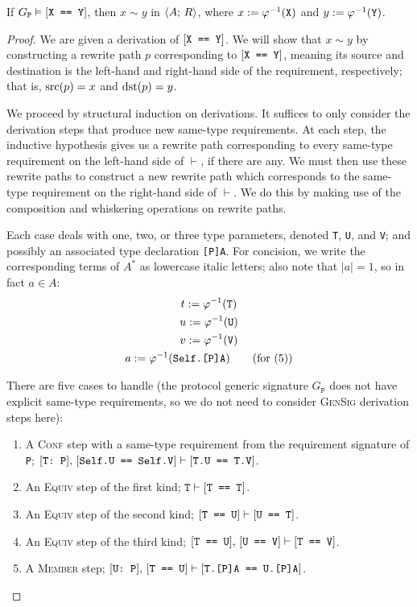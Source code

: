 \documentclass[../generics]{subfiles}
\begin{document}
\begin{theorem}\label{derivation to path}
If $G_\texttt{P}\vDash[\texttt{X == Y}]$, then $x\sim y$ in $\langle A;\,R\rangle$, where $x:=\varphi^{-1}(\texttt{X})$ and $y:=\varphi^{-1}(\texttt{Y})$.
\end{theorem}
\begin{proof}
We are given a derivation of $[\texttt{X == Y}]$. We will show that $x\sim y$ by constructing a rewrite path $p$ corresponding to $[\texttt{X == Y}]$, meaning its source and destination is the left-hand and right-hand side of the requirement, respectively; that is, $\operatorname{src}(p)=x$ and $\operatorname{dst}(p)=y$.

We proceed by structural induction on derivations. It suffices to only consider the derivation steps that produce new same-type requirements. At each step, the inductive hypothesis gives us a rewrite path corresponding to every same-type requirement on the left-hand side of $\vdash$, if there are any. We must then use these rewrite paths to construct a new rewrite path which corresponds to the same-type requirement on the right-hand side of $\vdash$. We do this by making use of the composition and whiskering operations on rewrite paths.

Each case deals with one, two, or three type parameters, denoted \texttt{T}, \texttt{U}, and \texttt{V}; and possibly an associated type declaration \texttt{[P]A}. For concision, we write the corresponding terms of $A^*$ as lowercase italic letters; also note that $|a|=1$, so in fact $a\in A$:
\begin{gather*}
t:=\varphi^{-1}(\texttt{T})\\
u:=\varphi^{-1}(\texttt{U})\\
v:=\varphi^{-1}(\texttt{V})\\
a:=\varphi^{-1}(\texttt{Self.[P]A})\qquad\mbox{(for (5))}
\end{gather*}

There are five cases to handle (the protocol generic signature $G_\texttt{P}$ does not have explicit same-type requirements, so we do not need to consider \textsc{GenSig} derivation steps here):
\begin{enumerate}
\item A \textsc{Conf} step with a same-type requirement from the requirement signature of \texttt{P}; $[\texttt{T:~P}],\,[\texttt{Self.U == Self.V}]\vdash[\texttt{T.U == T.V}]$.
\item An \textsc{Equiv} step of the first kind; $\texttt{T}\vdash[\texttt{T == T}]$.
\item An \textsc{Equiv} step of the second kind; $[\texttt{T == U}]\vdash[\texttt{U == T}]$.
\item An \textsc{Equiv} step of the third kind; $[\texttt{T == U}],\,[\texttt{U == V}]\vdash[\texttt{T == V}]$.
\item A \textsc{Member} step; $[\texttt{U:~P}],\,[\texttt{T == U}]\vdash[\texttt{T.[P]A == U.[P]A}]$.
\end{enumerate}


\end{proof}
\end{document}
